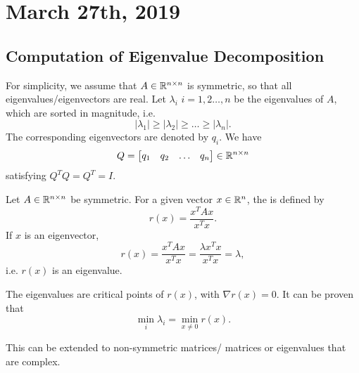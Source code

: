 \documentclass[../main/main.tex]{subfiles}
\begin{document}
\section{March 27th, 2019}
\subsection{Computation of Eigenvalue Decomposition}
For simplicity, we assume that $A\in \mathbb{R}^{n\times n}$ is symmetric, so that all eigenvalues/eigenvectors are real. Let $\lambda_i$ $i=1,2\ldots,n$ be the eigenvalues of $A$, which are sorted in magnitude, i.e.  \[
|\lambda_1|\ge |\lambda_2|\ge \ldots\ge |\lambda_n|
.\] 
The corresponding eigenvectors are denoted by $q_i$. We have  \[
	Q=\begin{bmatrix} q_1 & q_2 &\ldots& q_{n}  \end{bmatrix} \in \mathbb{R}^{n\times n}
\] satisfying $Q^{T}Q=Q^{T}=I$.
\begin{definition}
	Let $A\in \mathbb{R}^{n\times n}$ be symmetric. For a given vector $x\in \mathbb{R}^{n}$, the  is defined by  \[
		r(x)=\frac{x^{T}Ax}{x^{T}x}
	.\] If $x$ is an eigenvector, \[
	r(x)=\frac{x^{T}Ax}{x^{T}x}= \frac{\lambda x^{T}x}{x^{T}x}=\lambda
,\] i.e. $r(x)$ is an eigenvalue.
\end{definition}
The eigenvalues are critical points of $r(x)$, with $\nabla r(x)=0$. It can be proven that  \[
	\min_i \lambda_i=\min_{x\neq 0} r(x)
.\]
\begin{remark}
	This can be extended to non-symmetric matrices/ matrices or eigenvalues that are complex.
\end{remark}
\end{document}
